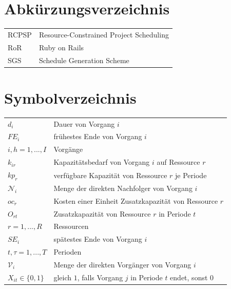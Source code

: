 \documentclass[a4paper,12pt,parskip,bibtotoc,liststotoc]{article}
\begin{document}
\newpage
\section*{Abkürzungsverzeichnis}
\begin{table}[h!]
    \vspace*{-3mm}
    \hspace*{2mm}
  \renewcommand{\arraystretch}{1,5}
    \begin{tabular}{ll}  %
           RCPSP      & Resource-Constrained Project Scheduling \\
           RoR & Ruby on Rails \\
SGS & Schedule Generation Scheme\\
	\end{tabular}
\end{table}
\newpage
\section*{Symbolverzeichnis}
\begin{table}[h!]
    \vspace*{-3mm}
        \hspace*{2mm}
      \renewcommand{\arraystretch}{1,5}
    \begin{tabular}{ll} 
$d_i$ & Dauer von Vorgang $i$ \\
$FE_i$& frühestes Ende von Vorgang $i$\\
$i,h=1,...,I$ & Vorgänge \\
$k_{ir}$& Kapazitätsbedarf von Vorgang $i$ auf Ressource $r$\\
$kp_r$ & verfügbare Kapazität von Ressource $r$ je Periode\\
$\mathcal{N}_i$ & Menge der direkten Nachfolger von Vorgang $i$ \\
$oc_r$ & Kosten einer Einheit Zusatzkapazität von Ressource $r$ \\
$O_{rt}$ & Zusatzkapazität von Ressource $r$ in Periode $t$ \\
$r=1,...,R$ & Ressourcen \\
$SE_i$& spätestes Ende von Vorgang $i$\\
$t,\tau=1,..., T$ & Perioden\\
$\mathcal{V}_i$ & Menge der direkten Vorgänger von Vorgang $i$ \\
$X_{it}\in\{0,1\}$ & gleich $1$, falls Vorgang $j$ in Periode $t$ endet, sonst $0$
  	\end{tabular}
\end{table}
\newpage
{}   %
\end{document}

